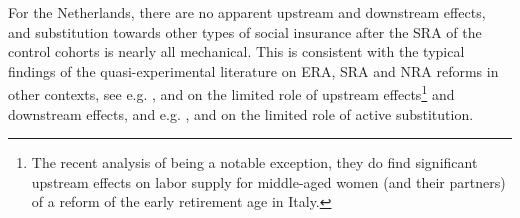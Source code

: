 \documentclass[12pt,a4paper]{article}
\begin{document}
For the Netherlands, there are no apparent upstream and downstream effects, and substitution towards other types of social insurance after the SRA of the control cohorts is nearly all mechanical. This is consistent with the typical findings of the quasi-experimental literature on ERA, SRA and NRA reforms in other contexts, see e.g. \cite{mastrobuoni_labor_2009}, \cite{staubli_does_2013} and \cite{geyer_closing_2021} on the limited role of upstream effects\footnote{The recent analysis of \cite{carta_working_2019} being a notable exception, they do find significant upstream effects on labor supply for middle-aged women (and their partners) of a reform of the early retirement age in Italy.} and downstream effects, and e.g. \cite{manoli_effects_2018}, \cite{oguzoglu_et_al_2020} and \cite{geyer_closing_2021} on the limited role of active substitution.
\end{document}
